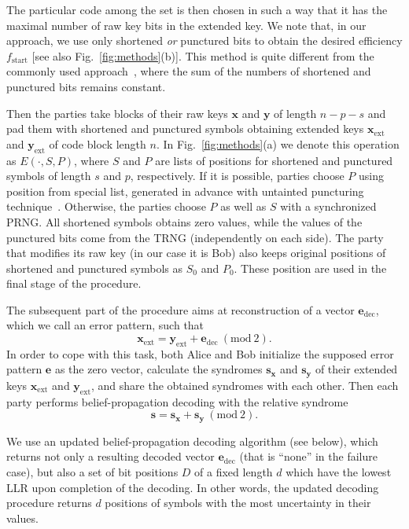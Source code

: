 \documentclass[aps,pra,twocolumn,amsmath,amssymb,nofootinbib,showpacs,superscriptaddress]{revtex4-1}
\renewcommand{\sb}{\mathbf{s}}
\newcommand{\sbx}{\mathbf{s_x}}
\newcommand{\sby}{\mathbf{s_y}}
\newcommand{\xb}{\mathbf{x}}
\newcommand{\xeb}{\mathbf{x}_{\mathrm{ext}}}
\newcommand{\yb}{\mathbf{y}}
\newcommand{\yeb}{\mathbf{y}_{\mathrm{ext}}}
\newcommand{\eb}{\mathbf{e}}
\newcommand{\fst}{f_{\mathrm{start}}}
\begin{document}
The particular code among the set is then chosen in such a way that it has the maximal number of raw key bits in the extended key.
We note that, in our approach, we use only shortened {\it or} punctured bits to obtain the desired efficiency $\fst$ [see also Fig.~\ref{fig:methods}(b)]. 
This method is quite different from the commonly used approach~\cite{LDPC4_adapt1,LDPC4_adapt2}, where the sum of the numbers of shortened and punctured bits remains constant.

Then the parties take blocks of their raw keys $\xb$ and $\yb$ of length $n-p-s$ and 
pad them with shortened and punctured symbols obtaining extended keys $\xeb$ and $\yeb$ of code block length $n$.
In Fig.~\ref{fig:methods}(a) we denote this operation as $E(\cdot, S, P)$, where $S$ and $P$ are lists of positions for shortened and punctured symbols of length $s$ and $p$, respectively.
If it is possible, parties choose $P$ using position from special list, generated in advance with untainted puncturing technique~\cite{UntP}.
Otherwise, the parties choose $P$ as well as $S$ with a synchronized PRNG.
All shortened symbols obtains zero values, while the values of the punctured bits come from the TRNG (independently on each side).
The party that modifies its raw key (in our case it is Bob) also keeps original positions of shortened and punctured symbols as $S_0$ and $P_0$.
These position are used in the final stage of the procedure.

The subsequent part of the procedure aims at reconstruction of a vector $\eb_\mathrm{dec}$, which we call an error pattern, such that 
\begin{equation}
	\xeb=\yeb+\eb_\mathrm{dec} ~ (\mathrm{mod}~2).
\end{equation}
In order to cope with this task, both Alice and Bob initialize the supposed error pattern $\eb$ as the zero vector, 
calculate the syndromes $\sbx$ and $\sby$ of their extended keys $\xeb$ and $\yeb$, and share the obtained syndromes with each other.
Then each party performs belief-propagation decoding with the relative syndrome 
\begin{equation} \label{eq:relsyndr}
	\sb=\sbx+\sby~(\mathrm{mod}~2).
\end{equation}

We use an updated belief-propagation decoding algorithm (see below), 
which returns not only a resulting decoded vector $\eb_\mathrm{dec}$ (that is ``none'' in the failure case), 
but also a set of bit positions $D$ of a fixed length $d$ which have the lowest LLR upon completion of the decoding.
In other words, the updated decoding procedure returns $d$ positions of symbols with the most uncertainty in their values.
\end{document}

